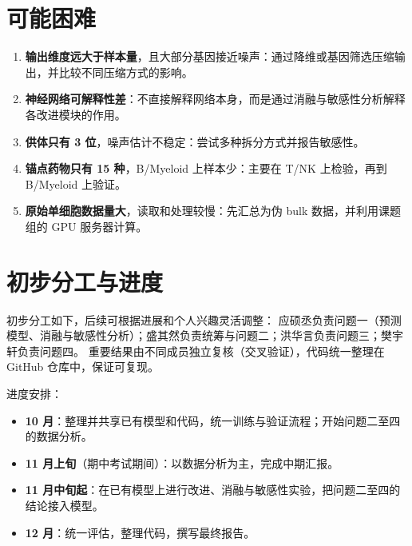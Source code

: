 \documentclass[11pt,a4paper]{article}
\begin{document}
\section{可能困难}

\begin{enumerate}
\item \textbf{输出维度远大于样本量}，且大部分基因接近噪声：通过降维或基因筛选压缩输出，并比较不同压缩方式的影响。
\item \textbf{神经网络可解释性差}：不直接解释网络本身，而是通过消融与敏感性分析解释各改进模块的作用。
\item \textbf{供体只有 3 位}，噪声估计不稳定：尝试多种拆分方式并报告敏感性。
\item \textbf{锚点药物只有 15 种}，B/Myeloid 上样本少：主要在 T/NK 上检验，再到 B/Myeloid 上验证。
\item \textbf{原始单细胞数据量大}，读取和处理较慢：先汇总为伪 bulk 数据，并利用课题组的 GPU 服务器计算。
\end{enumerate}

\section{初步分工与进度}

初步分工如下，后续可根据进展和个人兴趣灵活调整：
应硕丞负责问题一（预测模型、消融与敏感性分析）；盛其然负责统筹与问题二；洪华言负责问题三；樊宇轩负责问题四。
重要结果由不同成员独立复核（交叉验证），代码统一整理在 GitHub 仓库中，保证可复现。

进度安排：
\begin{itemize}
\item \textbf{10 月}：整理并共享已有模型和代码，统一训练与验证流程；开始问题二至四的数据分析。
\item \textbf{11 月上旬}（期中考试期间）：以数据分析为主，完成中期汇报。
\item \textbf{11 月中旬起}：在已有模型上进行改进、消融与敏感性实验，把问题二至四的结论接入模型。
\item \textbf{12 月}：统一评估，整理代码，撰写最终报告。
\end{itemize}
\end{document}
